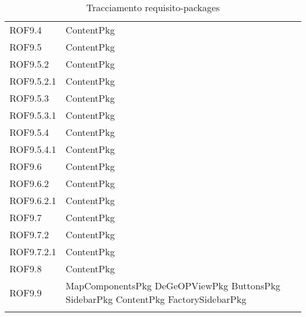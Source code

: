 \begin{longtable}{p{2.5cm}!{\VRule[1pt]}p{5cm}}
		ROF9.4 & ContentPkg\\
		ROF9.5 & ContentPkg\\
		ROF9.5.2 & ContentPkg\\
		ROF9.5.2.1 & ContentPkg\\
		ROF9.5.3 & ContentPkg\\
		ROF9.5.3.1 & ContentPkg\\
		ROF9.5.4 & ContentPkg\\
		ROF9.5.4.1 & ContentPkg\\
		ROF9.6 & ContentPkg\\
		ROF9.6.2 & ContentPkg\\
		ROF9.6.2.1 & ContentPkg\\
		ROF9.7 & ContentPkg\\
		ROF9.7.2 & ContentPkg\\
		ROF9.7.2.1 & ContentPkg\\
		ROF9.8 & ContentPkg\\
		ROF9.9 & MapComponentsPkg \newline DeGeOPViewPkg \newline ButtonsPkg \newline SidebarPkg \newline ContentPkg \newline FactorySidebarPkg\\
		\caption{Tracciamento requisito-packages}
	\end{longtable}
	
